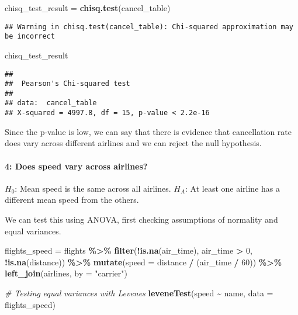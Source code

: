 \documentclass[
]{article}
\newenvironment{Shaded}{\begin{snugshade}}{\end{snugshade}}
\newcommand{\AttributeTok}[1]{\textcolor[rgb]{0.13,0.29,0.53}{#1}}
\newcommand{\CommentTok}[1]{\textcolor[rgb]{0.56,0.35,0.01}{\textit{#1}}}
\newcommand{\DecValTok}[1]{\textcolor[rgb]{0.00,0.00,0.81}{#1}}
\newcommand{\FunctionTok}[1]{\textcolor[rgb]{0.13,0.29,0.53}{\textbf{#1}}}
\newcommand{\NormalTok}[1]{#1}
\newcommand{\OtherTok}[1]{\textcolor[rgb]{0.56,0.35,0.01}{#1}}
\newcommand{\SpecialCharTok}[1]{\textcolor[rgb]{0.81,0.36,0.00}{\textbf{#1}}}
\newcommand{\StringTok}[1]{\textcolor[rgb]{0.31,0.60,0.02}{#1}}
\begin{document}
\begin{Shaded}
\begin{Highlighting}[]
\NormalTok{chisq\_test\_result }\OtherTok{=} \FunctionTok{chisq.test}\NormalTok{(cancel\_table)}
\end{Highlighting}
\end{Shaded}

\begin{verbatim}
## Warning in chisq.test(cancel_table): Chi-squared approximation may be incorrect
\end{verbatim}

\begin{Shaded}
\begin{Highlighting}[]
\NormalTok{chisq\_test\_result}
\end{Highlighting}
\end{Shaded}

\begin{verbatim}
## 
##  Pearson's Chi-squared test
## 
## data:  cancel_table
## X-squared = 4997.8, df = 15, p-value < 2.2e-16
\end{verbatim}

Since the p-value is low, we can say that there is evidence that
cancellation rate does vary across different airlines and we can reject
the null hypothesis.

\paragraph{4: Does speed vary across
airlines?}\label{does-speed-vary-across-airlines}

\(H_0\): Mean speed is the same across all airlines. \(H_A\): At least
one airline has a different mean speed from the others.

We can test this using ANOVA, first checking assumptions of normality
and equal variances.

\begin{Shaded}
\begin{Highlighting}[]
\NormalTok{flights\_speed }\OtherTok{=}\NormalTok{ flights }\SpecialCharTok{\%\textgreater{}\%}
  \FunctionTok{filter}\NormalTok{(}\SpecialCharTok{!}\FunctionTok{is.na}\NormalTok{(air\_time), air\_time }\SpecialCharTok{\textgreater{}} \DecValTok{0}\NormalTok{, }\SpecialCharTok{!}\FunctionTok{is.na}\NormalTok{(distance)) }\SpecialCharTok{\%\textgreater{}\%}
  \FunctionTok{mutate}\NormalTok{(}\AttributeTok{speed =}\NormalTok{ distance }\SpecialCharTok{/}\NormalTok{ (air\_time }\SpecialCharTok{/} \DecValTok{60}\NormalTok{)) }\SpecialCharTok{\%\textgreater{}\%} 
  \FunctionTok{left\_join}\NormalTok{(airlines, }\AttributeTok{by =} \StringTok{"carrier"}\NormalTok{)}

\CommentTok{\# Testing equal variances with Levene\textquotesingle{}s}
\FunctionTok{leveneTest}\NormalTok{(speed }\SpecialCharTok{\textasciitilde{}}\NormalTok{ name, }\AttributeTok{data =}\NormalTok{ flights\_speed)}
\end{Highlighting}
\end{Shaded}
\end{document}
